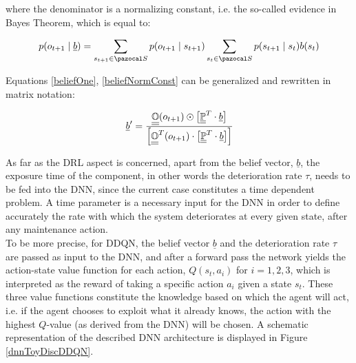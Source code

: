 where the denominator is a normalizing constant, i.e. the so-called evidence in Bayes Theorem, which is equal to:

\begin{equation}
    p(o_{t+1}\mid \underline{b}) = \sum _{s_{t+1}\in \ccal{S}} p(o_{t+1}\mid s_{t+1}) \sum _{s_t\in \ccal{S}} p(s_{t+1}\mid s_t) b(s_t) \label{beliefNormConst}
\end{equation}

\newpage

Equations \ref{beliefOne}, \ref{beliefNormConst} can be generalized and rewritten in matrix notation:

\begin{equation}
    \underline{b}^{\prime} = \cfrac{\underline{\underline{\mathbb{O}}}(o_{t+1}) \odot \big[ \underline{\underline{\mathbb{P}}}^T\cdot \underline{b}\big]}{\Big [ \underline{\underline{\mathbb{O}}}^T(o_{t+1}) \cdot \big[ \underline{\underline{\mathbb{P}}}^T\cdot \underline{b}\big] \Big ]} \label{toyDiscEq}
\end{equation}


As far as the \gls{DRL} aspect is concerned, apart from the belief vector, $\underline{b}$, the exposure time of the component, in other words the deterioration rate $\tau$, needs to be fed into the \gls{DNN}, since the current case constitutes a time dependent problem. A time parameter is a necessary input for the \gls{DNN} in order to define accurately the rate with which the system deteriorates at every given state, after any maintenance action.\\

To be more precise, for \gls{DDQN}, the belief vector $\underline{b}$ and the deterioration rate $\tau$ are passed as input to the \gls{DNN}, and after a forward pass the network yields the action-state value function for each action, $Q(s_t, a_i)$ for $i=1,2,3$, which is interpreted as the reward of taking a specific action $a_i$ given a state $s_t$. These three value functions constitute the knowledge based on which the agent will act, i.e. if the agent chooses to exploit what it already knows, the action with the highest $Q$-value (as derived from the \gls{DNN}) will be chosen. A schematic representation of the described \gls{DNN} architecture is displayed in Figure \ref{dnnToyDiscDDQN}.

